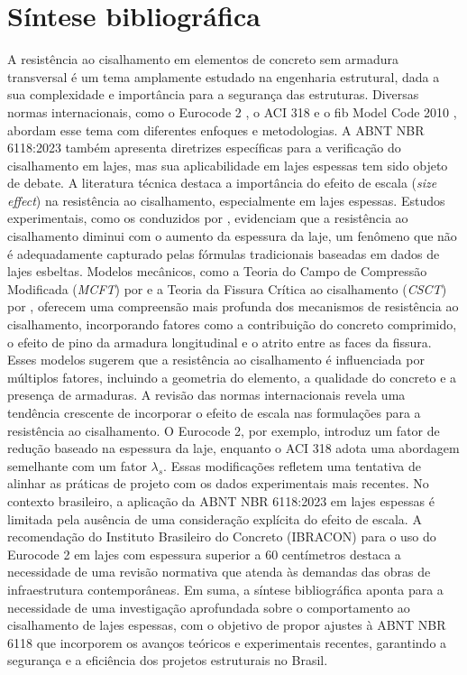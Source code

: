 \chapter{Síntese bibliográfica}
A resistência ao cisalhamento em elementos de concreto sem armadura transversal é um tema amplamente estudado na engenharia estrutural, dada a sua complexidade e importância para a segurança das estruturas. Diversas normas internacionais, como o Eurocode 2 \parencite{CEN2004}, o ACI 318 \parencite{ACI318:2019} e o fib Model Code 2010 \parencite{FIB:2020}, abordam esse tema com diferentes enfoques e metodologias. A ABNT NBR 6118:2023 \parencite{NBR6118:2023} também apresenta diretrizes específicas para a verificação do cisalhamento em lajes, mas sua aplicabilidade em lajes espessas tem sido objeto de debate.
A literatura técnica destaca a importância do efeito de escala (\textit{size effect}) na resistência ao cisalhamento, especialmente em lajes espessas. Estudos experimentais, como os conduzidos por \textcite{Hedman1975shear}, evidenciam que a resistência ao cisalhamento diminui com o aumento da espessura da laje, um fenômeno que não é adequadamente capturado pelas fórmulas tradicionais baseadas em dados de lajes esbeltas.
Modelos mecânicos, como a Teoria do Campo de Compressão Modificada (\textit{MCFT}) por \textcite{Vecchio1986} e a Teoria da Fissura Crítica ao cisalhamento (\textit{CSCT}) por \textcite{Muttoni2023}, oferecem uma compreensão mais profunda dos mecanismos de resistência ao cisalhamento, incorporando fatores como a contribuição do concreto comprimido, o efeito de pino da armadura longitudinal e o atrito entre as faces da fissura. Esses modelos sugerem que a resistência ao cisalhamento é influenciada por múltiplos fatores, incluindo a geometria do elemento, a qualidade do concreto e a presença de armaduras.
A revisão das normas internacionais revela uma tendência crescente de incorporar o efeito de escala nas formulações para a resistência ao cisalhamento. O Eurocode 2, por exemplo, introduz um fator de redução baseado na espessura da laje, enquanto o ACI 318 adota uma abordagem semelhante com um fator $\lambda_s$. Essas modificações refletem uma tentativa de alinhar as práticas de projeto com os dados experimentais mais recentes.
No contexto brasileiro, a aplicação da ABNT NBR 6118:2023 em lajes espessas é limitada pela ausência de uma consideração explícita do efeito de escala. A recomendação do Instituto Brasileiro do Concreto (IBRACON) para o uso do Eurocode 2 em lajes com espessura superior a 60 centímetros destaca a necessidade de uma revisão normativa que atenda às demandas das obras de infraestrutura contemporâneas.
Em suma, a síntese bibliográfica aponta para a necessidade de uma investigação aprofundada sobre o comportamento ao cisalhamento de lajes espessas, com o objetivo de propor ajustes à ABNT NBR 6118 que incorporem os avanços teóricos e experimentais recentes, garantindo a segurança e a eficiência dos projetos estruturais no Brasil. 


